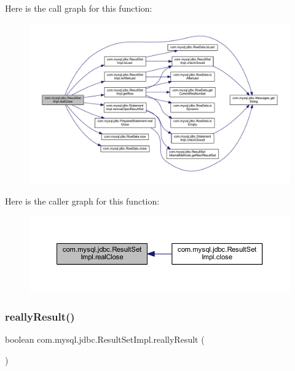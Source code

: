 Here is the call graph for this function\+:
\nopagebreak
\begin{figure}[H]
\begin{center}
\leavevmode
\includegraphics[width=350pt]{classcom_1_1mysql_1_1jdbc_1_1_result_set_impl_ab017e327bc96791e541af9d87b228472_cgraph}
\end{center}
\end{figure}
Here is the caller graph for this function\+:
\nopagebreak
\begin{figure}[H]
\begin{center}
\leavevmode
\includegraphics[width=350pt]{classcom_1_1mysql_1_1jdbc_1_1_result_set_impl_ab017e327bc96791e541af9d87b228472_icgraph}
\end{center}
\end{figure}
\mbox{\label{classcom_1_1mysql_1_1jdbc_1_1_result_set_impl_aa8f663e9020bd6661b377d8314b74964}} 
\subsubsection{\texorpdfstring{really\+Result()}{reallyResult()}}
{\footnotesize\ttfamily boolean com.\+mysql.\+jdbc.\+Result\+Set\+Impl.\+really\+Result (\begin{DoxyParamCaption}{ }\end{DoxyParamCaption})}

